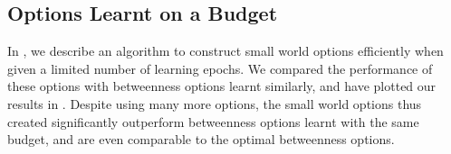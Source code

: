 \subsection{Options Learnt on a Budget}
In , we describe an algorithm to construct small world
options efficiently when given a limited number of learning epochs. We
compared the performance of these options with betweenness options
learnt similarly, and have plotted our results in
. Despite using many more
options, the small world options thus created significantly outperform
betweenness options learnt with the same budget, and are even comparable
to the optimal betweenness options.

